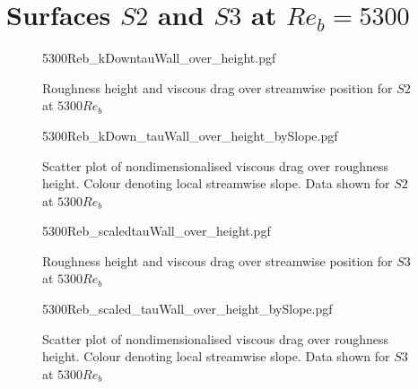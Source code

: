 \section{Surfaces $S2$ and $S3$ at $Re_b = 5300$}
\begin{figure}[h!]
    \centering
    {5300Reb_kDowntauWall_over_height.pgf}
    \caption{Roughness height and viscous drag over streamwise position for  $S2$ at $5300 Re_b$}
\end{figure}
\begin{figure}[h!]
    \centering
    \hspace{0.9cm}
    {5300Reb_kDown_tauWall_over_height_bySlope.pgf}
    \caption[Scatterplot of viscous drag over physical roughness height at $Re_b = 5300$ for $S2$]{Scatter plot of nondimensionalised viscous drag over roughness height. Colour denoting local streamwise slope. Data shown for $S2$ at $5300 Re_b$}
\end{figure}
\begin{figure}[h!]
    \centering
    {5300Reb_scaledtauWall_over_height.pgf}
    \caption{Roughness height and viscous drag over streamwise position for  $S3$ at $5300 Re_b$}
\end{figure}
\begin{figure}[h!]
    \centering
    \hspace{0.9cm}
    {5300Reb_scaled_tauWall_over_height_bySlope.pgf}
    \caption[Scatterplot of viscous drag over physical roughness height at $Re_b = 5300$ for $S3$]{Scatter plot of nondimensionalised viscous drag over roughness height. Colour denoting local streamwise slope. Data shown for $S3$ at $5300 Re_b$}
\end{figure}
\clearpage
